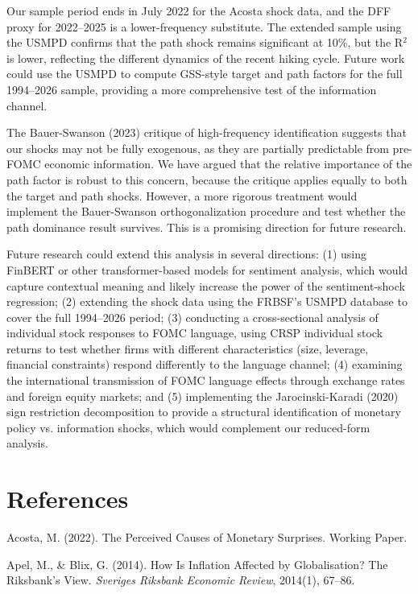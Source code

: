 \documentclass[12pt]{article}
\begin{document}
Our sample period ends in July 2022 for the Acosta shock data, and the DFF proxy for 2022--2025 is a lower-frequency substitute. The extended sample using the USMPD confirms that the path shock remains significant at 10\%, but the R$^2$ is lower, reflecting the different dynamics of the recent hiking cycle. Future work could use the USMPD to compute GSS-style target and path factors for the full 1994--2026 sample, providing a more comprehensive test of the information channel.

The Bauer-Swanson (2023) critique of high-frequency identification suggests that our shocks may not be fully exogenous, as they are partially predictable from pre-FOMC economic information. We have argued that the relative importance of the path factor is robust to this concern, because the critique applies equally to both the target and path shocks. However, a more rigorous treatment would implement the Bauer-Swanson orthogonalization procedure and test whether the path dominance result survives. This is a promising direction for future research.

Future research could extend this analysis in several directions: (1) using FinBERT or other transformer-based models for sentiment analysis, which would capture contextual meaning and likely increase the power of the sentiment-shock regression; (2) extending the shock data using the FRBSF's USMPD database to cover the full 1994--2026 period; (3) conducting a cross-sectional analysis of individual stock responses to FOMC language, using CRSP individual stock returns to test whether firms with different characteristics (size, leverage, financial constraints) respond differently to the language channel; (4) examining the international transmission of FOMC language effects through exchange rates and foreign equity markets; and (5) implementing the Jarocinski-Karadi (2020) sign restriction decomposition to provide a structural identification of monetary policy vs. information shocks, which would complement our reduced-form analysis.


\section{References}

Acosta, M. (2022). The Perceived Causes of Monetary Surprises. Working Paper.

Apel, M., \& Blix, G. (2014). How Is Inflation Affected by Globalisation? The Riksbank's View. \textit{Sveriges Riksbank Economic Review}, 2014(1), 67--86.
\end{document}

